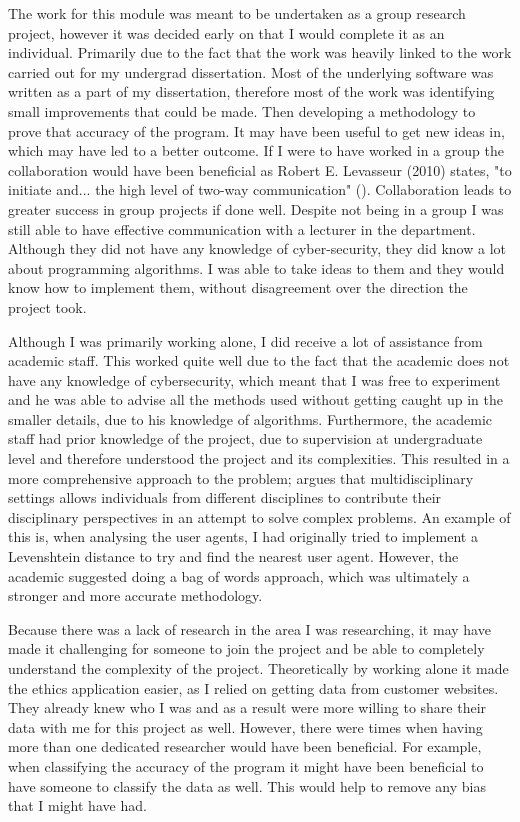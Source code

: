 The work for this module was meant to be undertaken as a group research project, however it was decided early on that I would complete it as an individual. Primarily due to the fact that the work was heavily linked to the work carried out for my undergrad dissertation. Most of the underlying software was written as a part of my dissertation, therefore most of the work was identifying small improvements that could be made. Then developing a methodology to prove that accuracy of the program. It may have been useful to get new ideas in, which may have led to a better outcome. If I were to have worked in a group the collaboration would have been beneficial as Robert E. Levasseur (2010) states, "to initiate and... the high level of two-way communication" (\cite{levasseur2010people}). Collaboration leads to greater success in group projects if done well. Despite not being in a group I was still able to have effective communication with a lecturer in the department. Although they did not have any knowledge of cyber-security, they did know a lot about programming algorithms. I was able to take ideas to them and they would know how to implement them, without disagreement over the direction the project took.

Although I was primarily working alone, I did receive a lot of assistance from academic staff. This worked quite well due to the fact that the academic does not have any knowledge of cybersecurity, which meant that I was free to experiment and he was able to advise all the methods used without getting caught up in the smaller details, due to his knowledge of algorithms. Furthermore, the academic staff had prior knowledge of the project, due to supervision at undergraduate level and therefore understood the project and its complexities. This resulted in a more comprehensive approach to the problem; \citeauthor{thurow1999dynamics} argues that multidisciplinary settings allows individuals from different disciplines to contribute their disciplinary perspectives in an attempt to solve complex problems. An example of this is, when analysing the user agents, I had originally tried to implement a Levenshtein distance to try and find the nearest user agent. However, the academic suggested doing a bag of words approach, which was ultimately a stronger and more accurate methodology. 

Because there was a lack of research in the area I was researching, it may have made it challenging for someone to join the project and be able to completely understand the complexity of the project. Theoretically by working alone it made the ethics application easier, as I relied on getting data from customer websites. They already knew who I was and as a result were more willing to share their data with me for this project as well. However, there were times when having more than one dedicated researcher would have been beneficial. For example, when classifying the accuracy of the program it might have been beneficial to have someone to classify the data as well. This would help to remove any bias that I might have had.

